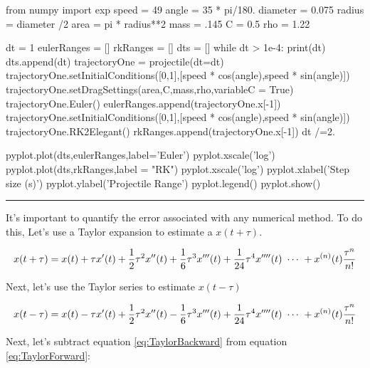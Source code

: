 \begin{enumerate}
\begin{codeexample}
\begin{VerbatimOut}{\listingFile}
from numpy import exp
speed = 49
angle = 35 * pi/180.
diameter = 0.075
radius = diameter /2
area = pi * radius**2 
mass = .145
C = 0.5
rho = 1.22

dt = 1
eulerRanges = []
rkRanges = []
dts = []
while dt > 1e-4:
    print(dt)
    dts.append(dt)
    trajectoryOne = projectile(dt=dt)
    trajectoryOne.setInitialConditions([0,1],[speed * cos(angle),speed * sin(angle)])
    trajectoryOne.setDragSettings(area,C,mass,rho,variableC = True)
    trajectoryOne.Euler()
    eulerRanges.append(trajectoryOne.x[-1])
    trajectoryOne.setInitialConditions([0,1],[speed * cos(angle),speed * sin(angle)])
    trajectoryOne.RK2Elegant()
    rkRanges.append(trajectoryOne.x[-1])
    dt /=2.
  
pyplot.plot(dts,eulerRanges,label='Euler')
pyplot.xscale('log')
pyplot.plot(dts,rkRanges,label = "RK")
pyplot.xscale('log')
pyplot.xlabel('Step size (s)')
pyplot.ylabel('Projectile Range')
pyplot.legend()
pyplot.show()
\end{VerbatimOut}
\end{codeexample}
\else
\noindent\rule{4 in}{0.01 in}
\fi
\end{enumerate}

It's important to quantify the error associated with any numerical
method.  To do this, Let's use a Taylor expansion to estimate a
$x(t + \tau)$.

\begin{equation}\label{eq:TaylorForward}
    x(t+\tau) = x(t) + \tau x'(t) + {1 \over 2} \tau^2 x''(t) +
     {1\over 6}\tau^3 x'''(t) + {1\over 24}\tau^4 x''''(t) ~\cdots~+ x^{(n)}(t) {\tau^n \over n!}
\end{equation}

Next, let's use the Taylor series to estimate $x(t - \tau)$

\begin{equation}\label{eq:TaylorBackward}
    x(t-\tau) = x(t) - \tau x'(t) + {1 \over 2} \tau^2 x''(t)
    - {1\over 6}\tau^3 x'''(t) + {1\over 24}\tau^4 x''''(t) ~\cdots~+ x^{(n)}(t) {\tau^n \over n!}
\end{equation}

Next, let's subtract equation \eqref{eq:TaylorBackward} from equation
\eqref{eq:TaylorForward}:

